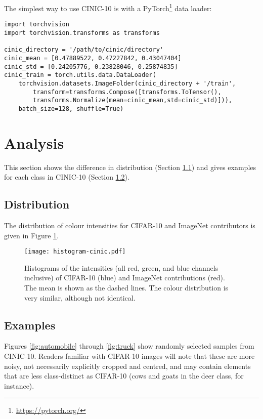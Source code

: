 \documentclass[coverpage]{Style/inftechrep}
\begin{document}
The simplest way to use CINIC-10 is with a PyTorch\footnote{\url{https://pytorch.org/}} data loader:

\begin{lstlisting}
import torchvision
import torchvision.transforms as transforms

cinic_directory = '/path/to/cinic/directory'
cinic_mean = [0.47889522, 0.47227842, 0.43047404]
cinic_std = [0.24205776, 0.23828046, 0.25874835]
cinic_train = torch.utils.data.DataLoader(
    torchvision.datasets.ImageFolder(cinic_directory + '/train',
    	transform=transforms.Compose([transforms.ToTensor(),
        transforms.Normalize(mean=cinic_mean,std=cinic_std)])),
    batch_size=128, shuffle=True)
\end{lstlisting}


\section{Analysis}

This section shows the difference in distribution (Section \ref{sec:distribution}) and gives examples for each class in CINIC-10 (Section \ref{sec:examples}).

\subsection{Distribution}\label{sec:distribution}

The distribution of colour intensities for CIFAR-10 and ImageNet contributors is given in Figure \ref{fig:distributions}.

\begin{figure}[!htbp]
\centering
    \texttt{[image: histogram-cinic.pdf]}
    \caption{Histograms of the intensities (all red, green, and blue channels inclusive) of CIFAR-10 (blue) and ImageNet contributions (red). The mean is shown as the dashed lines. The colour distribution is very similar, although not identical.}
  \label{fig:distributions}
\end{figure}

\subsection{Examples}\label{sec:examples}

Figures \ref{fig:automobile} through \ref{fig:truck} show randomly selected samples from CINIC-10. Readers familiar with CIFAR-10 images will note that these are more noisy, not necessarily explicitly cropped and centred, and may contain elements that are less class-distinct as CIFAR-10 (cows and goats in the deer class, for instance).
\end{document}
